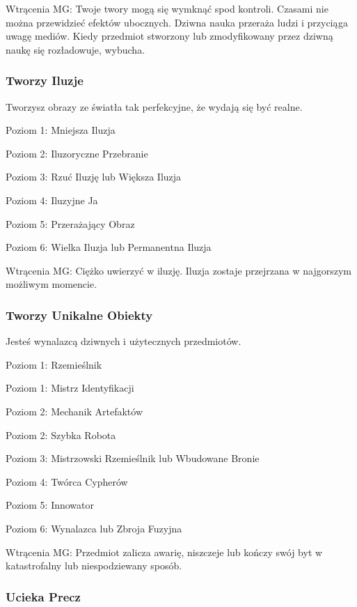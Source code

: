 Wtrącenia MG: Twoje twory mogą się wymknąć spod kontroli. Czasami nie można przewidzieć efektów ubocznych. Dziwna nauka przeraża ludzi i przyciąga uwagę mediów. Kiedy przedmiot stworzony lub zmodyfikowany przez dziwną naukę się 
rozładowuje, wybucha. 

\subsubsection{Tworzy Iluzje}

Tworzysz obrazy ze światła tak perfekcyjne, że wydają się być realne. 

Poziom 1: Mniejsza Iluzja

Poziom 2:  Iluzoryczne Przebranie

Poziom 3: Rzuć Iluzję lub Większa Iluzja

Poziom 4: Iluzyjne Ja

Poziom 5: Przerażający Obraz

Poziom 6: Wielka Iluzja lub Permanentna Iluzja

Wtrącenia MG: Ciężko uwierzyć w iluzję. Iluzja zostaje przejrzana w najgorszym możliwym momencie.

\subsubsection{Tworzy Unikalne Obiekty}

Jesteś wynalazcą dziwnych i użytecznych przedmiotów. 

Poziom 1: Rzemieślnik

Poziom 1: Mistrz Identyfikacji

Poziom 2: Mechanik Artefaktów

Poziom 2: Szybka Robota

Poziom 3: Mistrzowski Rzemieślnik lub Wbudowane Bronie

Poziom 4: Twórca Cypherów

Poziom 5: Innowator

Poziom 6: Wynalazca lub Zbroja Fuzyjna

Wtrącenia MG: Przedmiot zalicza awarię, niszczeje lub kończy swój byt w katastrofalny lub niespodziewany sposób.

\subsubsection{Ucieka Precz}

